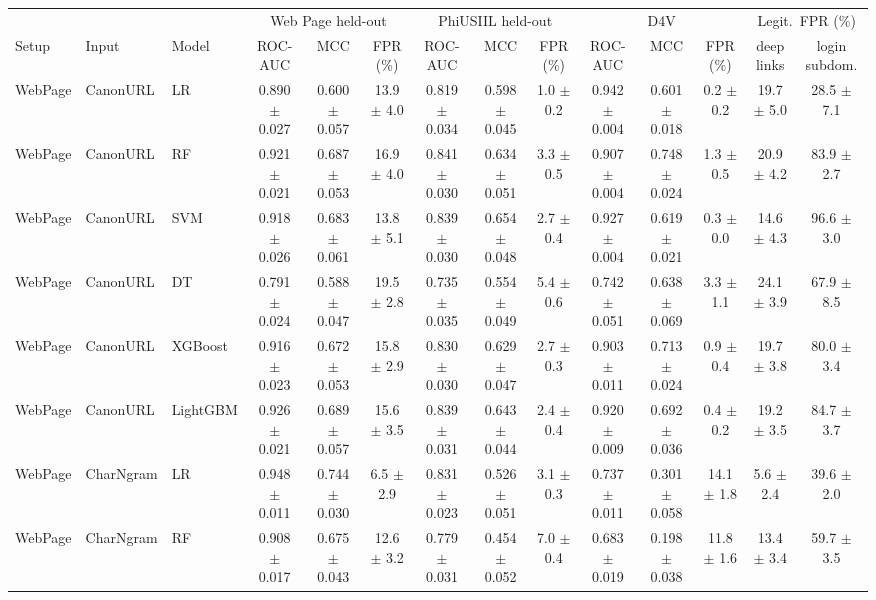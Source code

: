 \begin{tabular}{@{}lllccccccccccc@{}}
\toprule
 & & & \multicolumn{3}{c}{Web Page held-out} & \multicolumn{3}{c}{PhiUSIIL held-out} & \multicolumn{3}{c}{D4V} & \multicolumn{2}{c}{Legit.\ FPR (\%)}\\
Setup & Input & Model & ROC-AUC & MCC & FPR (\%) & ROC-AUC & MCC & FPR (\%) & ROC-AUC & MCC & FPR (\%) & deep links & login subdom.\\
\midrule
WebPage & CanonURL & LR & 0.890 $\pm$ 0.027 & 0.600 $\pm$ 0.057 & 13.9 $\pm$ 4.0 & 0.819 $\pm$ 0.034 & 0.598 $\pm$ 0.045 & 1.0 $\pm$ 0.2 & 0.942 $\pm$ 0.004 & 0.601 $\pm$ 0.018 & 0.2 $\pm$ 0.2 & 19.7 $\pm$ 5.0 & 28.5 $\pm$ 7.1\\
WebPage & CanonURL & RF & 0.921 $\pm$ 0.021 & 0.687 $\pm$ 0.053 & 16.9 $\pm$ 4.0 & 0.841 $\pm$ 0.030 & 0.634 $\pm$ 0.051 & 3.3 $\pm$ 0.5 & 0.907 $\pm$ 0.004 & 0.748 $\pm$ 0.024 & 1.3 $\pm$ 0.5 & 20.9 $\pm$ 4.2 & 83.9 $\pm$ 2.7\\
WebPage & CanonURL & SVM & 0.918 $\pm$ 0.026 & 0.683 $\pm$ 0.061 & 13.8 $\pm$ 5.1 & 0.839 $\pm$ 0.030 & 0.654 $\pm$ 0.048 & 2.7 $\pm$ 0.4 & 0.927 $\pm$ 0.004 & 0.619 $\pm$ 0.021 & 0.3 $\pm$ 0.0 & 14.6 $\pm$ 4.3 & 96.6 $\pm$ 3.0\\
WebPage & CanonURL & DT & 0.791 $\pm$ 0.024 & 0.588 $\pm$ 0.047 & 19.5 $\pm$ 2.8 & 0.735 $\pm$ 0.035 & 0.554 $\pm$ 0.049 & 5.4 $\pm$ 0.6 & 0.742 $\pm$ 0.051 & 0.638 $\pm$ 0.069 & 3.3 $\pm$ 1.1 & 24.1 $\pm$ 3.9 & 67.9 $\pm$ 8.5\\
WebPage & CanonURL & XGBoost & 0.916 $\pm$ 0.023 & 0.672 $\pm$ 0.053 & 15.8 $\pm$ 2.9 & 0.830 $\pm$ 0.030 & 0.629 $\pm$ 0.047 & 2.7 $\pm$ 0.3 & 0.903 $\pm$ 0.011 & 0.713 $\pm$ 0.024 & 0.9 $\pm$ 0.4 & 19.7 $\pm$ 3.8 & 80.0 $\pm$ 3.4\\
WebPage & CanonURL & LightGBM & 0.926 $\pm$ 0.021 & 0.689 $\pm$ 0.057 & 15.6 $\pm$ 3.5 & 0.839 $\pm$ 0.031 & 0.643 $\pm$ 0.044 & 2.4 $\pm$ 0.4 & 0.920 $\pm$ 0.009 & 0.692 $\pm$ 0.036 & 0.4 $\pm$ 0.2 & 19.2 $\pm$ 3.5 & 84.7 $\pm$ 3.7\\
\midrule
WebPage & CharNgram & LR & 0.948 $\pm$ 0.011 & 0.744 $\pm$ 0.030 & 6.5 $\pm$ 2.9 & 0.831 $\pm$ 0.023 & 0.526 $\pm$ 0.051 & 3.1 $\pm$ 0.3 & 0.737 $\pm$ 0.011 & 0.301 $\pm$ 0.058 & 14.1 $\pm$ 1.8 & 5.6 $\pm$ 2.4 & 39.6 $\pm$ 2.0\\
WebPage & CharNgram & RF & 0.908 $\pm$ 0.017 & 0.675 $\pm$ 0.043 & 12.6 $\pm$ 3.2 & 0.779 $\pm$ 0.031 & 0.454 $\pm$ 0.052 & 7.0 $\pm$ 0.4 & 0.683 $\pm$ 0.019 & 0.198 $\pm$ 0.038 & 11.8 $\pm$ 1.6 & 13.4 $\pm$ 3.4 & 59.7 $\pm$ 3.5\\

\end{tabular}
